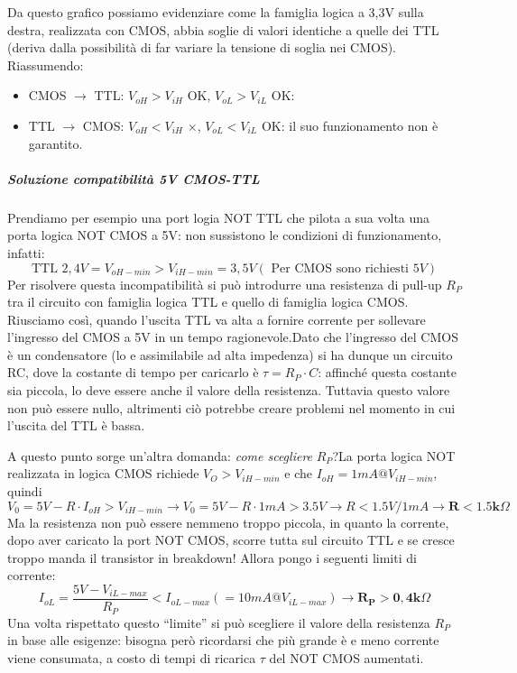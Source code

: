 \documentclass[
]{book}
\providecommand{\tightlist}{%
  \setlength{\itemsep}{0pt}\setlength{\parskip}{0pt}}
\begin{document}
Da questo grafico possiamo evidenziare come la famiglia logica a 3,3V
sulla destra, realizzata con CMOS, abbia soglie di valori identiche a
quelle dei TTL (deriva dalla possibilità di far variare la tensione di
soglia nei CMOS). Riassumendo:

\begin{itemize}
\tightlist
\item
  CMOS \(\to\) TTL: \(V_{oH}>V_{iH}\) OK, \(V_{oL}>V_{iL}\) OK:
\item
  TTL \(\to\) CMOS: \(V_{oH}<V_{iH}\) \(\times\), \(V_{oL}<V_{iL}\) OK:
  il suo funzionamento non è garantito.
\end{itemize}

\subparagraph{Soluzione compatibilità 5V
CMOS-TTL}\label{soluzione-compatibilituxe0-5v-cmos-ttl}

Prendiamo per esempio una port logia NOT TTL che pilota a sua volta una
porta logica NOT CMOS a 5V: non sussistono le condizioni di
funzionamento, infatti: \[
\text{TTL } 2,4V=V_{oH-min}>V_{iH-min}=3,5V (\text{ Per CMOS sono richiesti } 5V)
\] Per risolvere questa incompatibilità si può introdurre una resistenza
di pull-up \(R_P\) tra il circuito con famiglia logica TTL e quello di
famiglia logica CMOS. Riusciamo così, quando l'uscita TTL va alta a
fornire corrente per sollevare l'ingresso del CMOS a 5V in un tempo
ragionevole.\newline Dato che l'ingresso del CMOS è un condensatore (lo
e assimilabile ad alta impedenza) si ha dunque un circuito RC, dove la
costante di tempo per caricarlo è \(\tau=R_{P}\cdot C\): affinché questa
costante sia piccola, lo deve essere anche il valore della resistenza.
Tuttavia questo valore non può essere nullo, altrimenti ciò potrebbe
creare problemi nel momento in cui l'uscita del TTL è bassa.

A questo punto sorge un'altra domanda: \emph{come scegliere}
\(\mathit{R_{P}}\)?\newline La porta logica NOT realizzata in logica
CMOS richiede \(V_{O}>V_{iH-min}\) e che \(I_{oH}=1mA@V_{iH-min}\),
quindi \[
V_{0}=5V-R\cdot I_{oH}>V_{iH-min}\to V_0=5V-R\cdot 1mA>3.5V\to R<1.5V/1mA\to \mathbf{R<1.5k}\Omega
\] Ma la resistenza non può essere nemmeno troppo piccola, in quanto la
corrente, dopo aver caricato la port NOT CMOS, scorre tutta sul circuito
TTL e se cresce troppo manda il transistor in breakdown! Allora pongo i
seguenti limiti di corrente: \[
I_{oL}=\frac{5V-V_{iL-max}}{R_P}<I_{oL-max} (=10mA@V_{iL-max}) \to \mathbf{R_P > 0,4 k}\Omega
\] Una volta rispettato questo ``limite'' si può scegliere il valore
della resistenza \(R_P\) in base alle esigenze: bisogna però ricordarsi
che più grande è e meno corrente viene consumata, a costo di tempi di
ricarica \(\tau\) del NOT CMOS aumentati.
\end{document}
